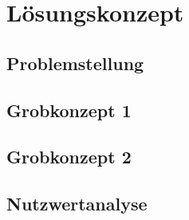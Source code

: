 \section{Lösungskonzept}

\subsection{Problemstellung}


\subsection{Grobkonzept 1}


\subsection{Grobkonzept 2}


\subsection{Nutzwertanalyse}





